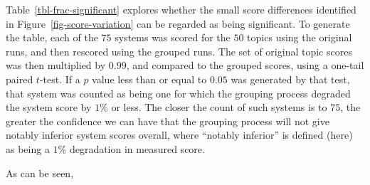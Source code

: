 
Table~\ref{tbl-frac-significant} explores whether the small score
differences identified in Figure~\ref{fig-score-variation} can be
regarded as being significant.
To generate the table, each of the $75$ systems was scored for the
$50$ topics using the original runs, and then rescored using the
grouped runs.
The set of original topic scores was then multiplied by $0.99$, and
compared to the grouped scores, using a one-tail paired $t$-test.
If a $p$ value less than or equal to $0.05$ was generated by that
test, that system was counted as being one for which the grouping
process degraded the system score by $1$\% or less.
The closer the count of such systems is to $75$, the greater the
confidence we can have that the grouping process will not give
notably inferior system scores overall, where ``notably inferior'' is
defined (here) as being a $1$\% degradation in measured score.

As can be seen, {}



